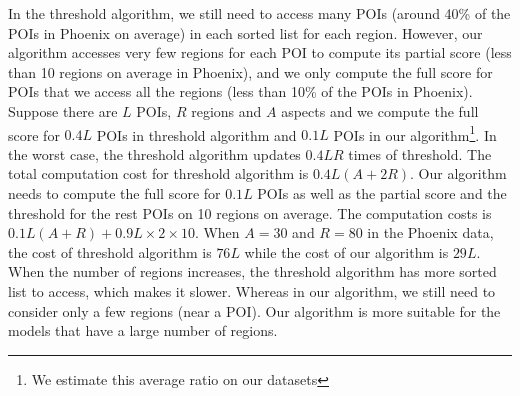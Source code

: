 In the threshold algorithm,
we still need to access many POIs (around 40\% of the POIs in Phoenix on average)
in each sorted list for each region.
However, our algorithm accesses very few regions
for each POI to compute its partial score (less than 10 regions on average in Phoenix),
and we only compute the full score for POIs that we access all the
regions (less than 10\% of the POIs in Phoenix).
Suppose there are $L$ POIs, $R$ regions and $A$ aspects and
we compute the full score for $0.4L$ POIs in threshold algorithm and $0.1L$ POIs
in our algorithm\footnote{We estimate this average ratio on our datasets}.
In the worst case, the threshold algorithm updates $0.4LR$ times of threshold.
The total computation cost for threshold algorithm is $0.4L(A+2R)$. Our algorithm needs to
compute the full score for $0.1L$ POIs as well as the partial score
and the threshold for the rest POIs on 10 regions on average.
The computation costs is $0.1L(A+R)+0.9L\times2\times10$. When $A=30$ and $R=80$ in the Phoenix data, the cost of
threshold algorithm is $76L$ while the cost of our algorithm is $29L$.
When the number of regions increases, the threshold algorithm has more sorted list to access,
which makes it slower. Whereas in our algorithm,
we still need to consider only a few regions (near a POI).
Our algorithm is more suitable for the models that have a large number of regions.

